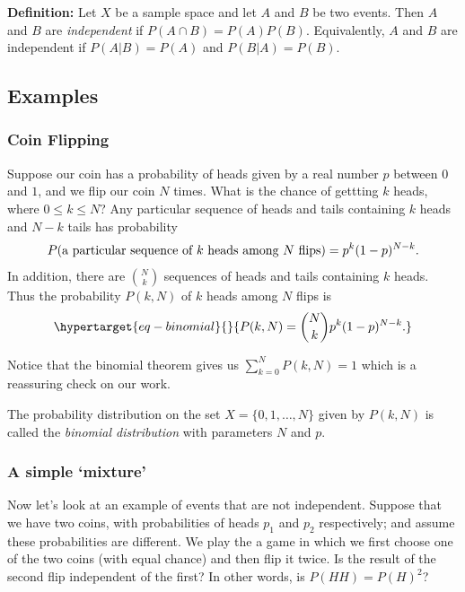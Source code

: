 \documentclass[
  11pt,
  letterpaper,
]{scrbook}
\theoremstyle{plain}
\theoremstyle{plain}
\theoremstyle{remark}
\begin{document}
\textbf{Definition:} Let \(X\) be a sample space and let \(A\) and \(B\)
be two events. Then \(A\) and \(B\) are \emph{independent} if
\(P(A\cap B)=P(A)P(B)\). Equivalently, \(A\) and \(B\) are independent
if \(P(A|B)=P(A)\) and \(P(B|A)=P(B)\).

\hypertarget{examples}{%
\subsection{Examples}\label{examples}}

\hypertarget{coin-flipping}{%
\subsubsection{Coin Flipping}\label{coin-flipping}}

Suppose our coin has a probability of heads given by a real number \(p\)
between \(0\) and \(1\), and we flip our coin \(N\) times. What is the
chance of gettting \(k\) heads, where \(0\le k\le N\)? Any particular
sequence of heads and tails containing \(k\) heads and \(N-k\) tails has
probability \[
P(\hbox{a particular sequence of $k$ heads among $N$ flips}) = p^{k}(1-p)^{N-k}.
\] In addition, there are \(\binom{N}{k}\) sequences of heads and tails
containing \(k\) heads. Thus the probability \(P(k,N)\) of \(k\) heads
among \(N\) flips is
\begin{equation}\protect\hypertarget{eq-binomial}{}{
P(k,N) = \binom{N}{k}p^{k}(1-p)^{N-k}.
}\label{eq-binomial}\end{equation}

Notice that the binomial theorem gives us \(\sum_{k=0}^{N} P(k,N) =1\)
which is a reassuring check on our work.

The probability distribution on the set \(X=\{0,1,\ldots,N\}\) given by
\(P(k,N)\) is called the \emph{binomial distribution} with parameters
\(N\) and \(p\).

\hypertarget{a-simple-mixture}{%
\subsubsection{A simple `mixture'}\label{a-simple-mixture}}

Now let's look at an example of events that are not independent. Suppose
that we have two coins, with probabilities of heads \(p_1\) and \(p_2\)
respectively; and assume these probabilities are different. We play the
a game in which we first choose one of the two coins (with equal chance)
and then flip it twice. Is the result of the second flip independent of
the first? In other words, is \(P(HH)=P(H)^2\)?
\end{document}
